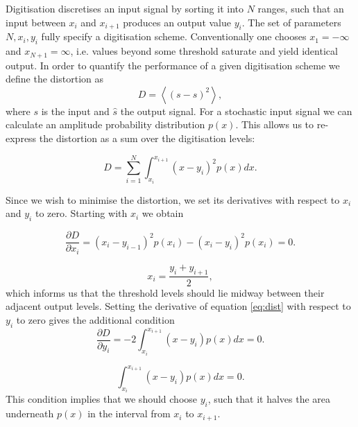 \documentclass[apj]{emulateapj}
\begin{document}
Digitisation discretises an input signal by sorting it into $N$ ranges, such that an input between $x_i$ and $x_{i+1}$ produces an output value $y_i$. The set of parameters $N, x_i, y_i$ fully specify a digitisation scheme. Conventionally one chooses $x_{1} = -\infty$ and $x_{N+1} = \infty$, i.e. values beyond some threshold saturate and yield identical output. In order to quantify the performance of a given digitisation scheme we define the distortion as
\begin{equation}\label{eq:distdef}
D = \left\langle  \left( s - \hat{s} \right)^2 \right\rangle,
\end{equation}
where $s$ is the input and $\hat{s}$ the output signal. For a stochastic input signal we can calculate an amplitude probability distribution $p(x)$. This allows us to re-express the distortion as a sum over the digitisation levels:

\begin{equation} \label{eq:dist}
D = \sum_{i = 1}^N \int_{x_i}^{x_{i+1}} \left(x-y_i\right)^2 p(x) dx.
\end{equation}

Since we wish to minimise the distortion, we set its derivatives with respect to $x_i$ and $y_i$ to zero. Starting with $x_i$ we obtain

\begin{equation} \label{eq:distderiv1}
\frac{\partial D}{\partial x_i} = \left(x_i-y_{i-1}\right)^2 p(x_i) - \left(x_i - y_i\right)^2 p(x_i) = 0.
\end{equation}

\begin{equation} \label{eq:digitequalspacecondition}
x_i = \frac{y_i+y_{i+1}}{2},
\end{equation}
which informs us that the threshold levels should lie midway between their adjacent output levels. Setting the derivative of equation \ref{eq:dist} with respect to $y_i$  to zero gives the additional condition
\begin{equation} \label{eq:distderiv2}
\frac{\partial D}{\partial y_i} = -2 \int_{x_i}^{x_{i+1}} \left( x-y_i \right) p(x) dx = 0.
\end{equation}

\begin{equation} \label{eq:digitareacondition}
\int_{x_i}^{x_{i+1}} \left( x-y_i \right) p(x) dx = 0.
\end{equation}
This condition implies that we should choose $y_i$, such that it halves the area underneath $p(x)$ in the interval from $x_i$ to $x_{i+1}$.
\end{document}
